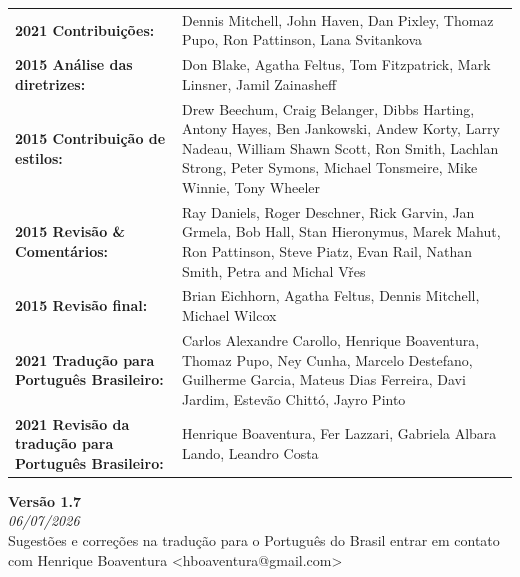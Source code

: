 \begin{titlepage}
        \begin{tabular}{ p{6.5cm} p{11.5cm} }
            \textbf{2021 Contribuições:}	& Dennis Mitchell, John Haven, Dan Pixley, Thomaz Pupo, Ron Pattinson, Lana Svitankova \\
            \textbf{2015 Análise das diretrizes:} & Don Blake, Agatha Feltus, Tom Fitzpatrick, Mark Linsner, Jamil Zainasheff \\
            \textbf{2015 Contribuição de estilos:} & Drew Beechum, Craig Belanger, Dibbs Harting, Antony Hayes, Ben Jankowski, Andew Korty,
            Larry Nadeau, William Shawn Scott, Ron Smith, Lachlan Strong, Peter Symons, Michael Tonsmeire, Mike Winnie, Tony Wheeler \\
            \textbf{2015 Revisão \& Comentários:} & Ray Daniels, Roger Deschner, Rick Garvin, Jan Grmela, Bob Hall, Stan Hieronymus, Marek Mahut, Ron Pattinson, Steve Piatz, Evan Rail, Nathan Smith, Petra and Michal Vřes\\
            \textbf{2015 Revisão final:} & Brian Eichhorn, Agatha Feltus, Dennis Mitchell, Michael Wilcox  \\
            \textbf{2021 Tradução para Português Brasileiro:} & Carlos Alexandre Carollo, Henrique Boaventura, Thomaz Pupo, Ney Cunha, Marcelo Destefano, Guilherme Garcia, Mateus Dias Ferreira, Davi Jardim, Estevão Chittó, Jayro Pinto \\
            \textbf{2021 Revisão da tradução para Português Brasileiro:} & Henrique Boaventura, Fer Lazzari, Gabriela Albara Lando, Leandro Costa
        \end{tabular}
        \vspace{0.5cm}
        \textbf{Versão 1.7}\\
        \footnotesize{\textit{06/07/2026}}\\
        \vspace{0.4cm}
        \footnotesize{Sugestões e correções na tradução para o Português do Brasil entrar em contato com Henrique Boaventura <hboaventura@gmail.com>}

\end{titlepage}
